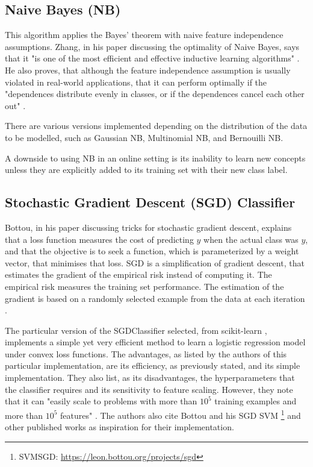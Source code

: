 \subsection{Naive Bayes (NB)}
This algorithm applies the Bayes' theorem with naive feature independence assumptions. Zhang, in his paper discussing the optimality of Naive Bayes, says that it "is one of the most efficient and effective inductive learning algorithms" \cite{zhang2004optimality}. He also proves, that although the feature independence assumption is usually violated in real-world applications, that it can perform optimally if the "dependences distribute evenly in classes, or if the dependences cancel each other out" \cite{zhang2004optimality}.

There are various versions implemented depending on the distribution of the data to be modelled, such as Gaussian NB, Multinomial NB, and Bernouilli NB.

A downside to using NB in an online setting is its inability to learn new concepts unless they are explicitly added to its training set with their new class label.

\subsection{Stochastic Gradient Descent (SGD) Classifier}
Bottou, in his paper discussing tricks for stochastic gradient descent, explains that a loss function measures the cost of predicting $\hat{y}$ when the actual class was $y$, and that the objective is to seek a function, which is parameterized by a weight vector, that minimises that loss.
SGD is a simplification of gradient descent, that estimates the gradient of the empirical risk instead of computing it. The empirical risk measures the training set performance. The estimation of the gradient is based on a randomly selected example from the data at each iteration \cite{bottou2012stochastic}.

The particular version of the SGDClassifier selected, from scikit-learn \cite{scikit-learn}, implements a simple yet very efficient method to learn a logistic regression model under convex loss functions. The advantages, as listed by the authors of this particular implementation, are its efficiency, as previously stated, and its simple implementation. They also list, as its disadvantages, the hyperparameters that the classifier requires and its sensitivity to feature scaling. However, they note that it can "easily scale to problems with more than $10^5$ training examples and more than $10^5$ features" \cite{scikit-learn-sgd}. The authors also cite Bottou and his SGD SVM \cite{bottou2008learning}\footnote{SVMSGD: \url{https://leon.bottou.org/projects/sgd}} and other published works \cite{tsuruoka2009stochastic, shalev2011pegasos} as inspiration for their implementation.

